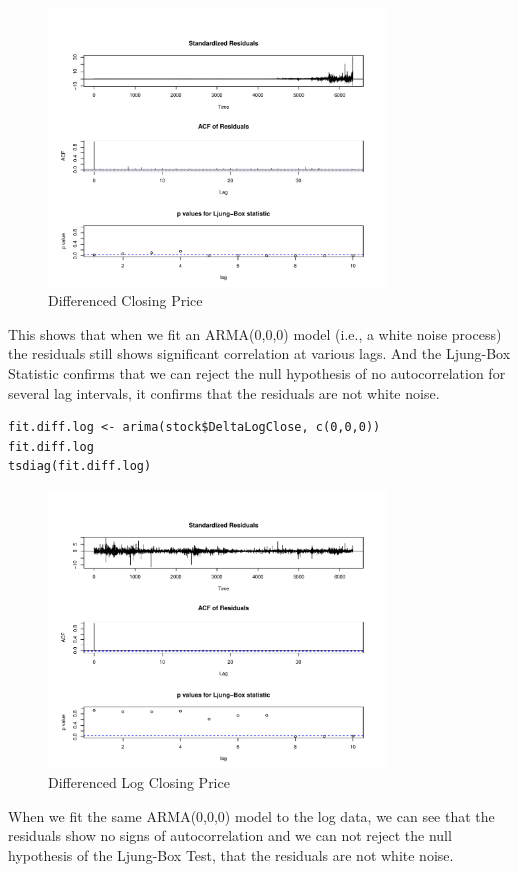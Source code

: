 \begin{figure}[H]
\centering
\includegraphics[width=0.8\textwidth]{plots/NVD3.pdf}
\caption{Differenced Closing Price}
\end{figure}

This shows that when we fit an ARMA(0,0,0) model (i.e., a white noise process) the residuals still shows significant correlation at various lags. And the Ljung-Box Statistic confirms that we can reject the null hypothesis of no autocorrelation for several lag intervals, it confirms that the residuals are not white noise. 

\begin{lstlisting}
fit.diff.log <- arima(stock$DeltaLogClose, c(0,0,0))
fit.diff.log
tsdiag(fit.diff.log)
\end{lstlisting}

\begin{figure}[H]
\centering
\includegraphics[width=0.8\textwidth]{plots/NVD4.pdf}
\caption{Differenced Log Closing Price }
\end{figure}

 When we fit the same ARMA(0,0,0) model to the log data, we can see that the residuals show no signs of autocorrelation and we can not reject the null hypothesis of the Ljung-Box Test, that the residuals are not white noise. 